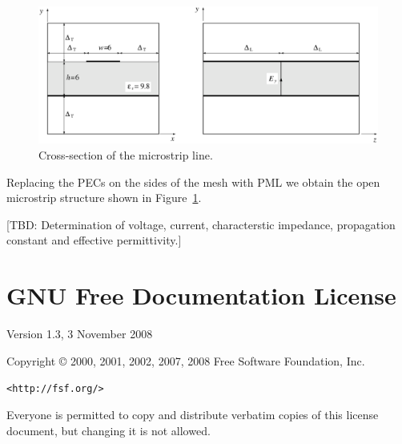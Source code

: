 \documentclass[onecolumn,a4paper]{article}
\numberwithin{equation}{section}
\begin{document}
\begin{figure}[ht]
\centerline{\includegraphics[width=0.75\linewidth]{figures/microstrip}}
\caption{\label{fg:microstrip}Cross-section of the microstrip line.}
\end{figure}

Replacing the PECs on the sides of the mesh with PML we obtain the open microstrip
structure shown in Figure~\ref{fg:microstrip}.

[TBD:  Determination of voltage, current, characterstic impedance, propagation constant 
and effective permittivity.]

%
%    
%
%
 

\label{sc:references}
\newpage
%
%    
%
%
\appendix
%
%
\section{GNU Free Documentation License}         
\label{ap:copyright}
%
%

\begin{center}

       Version 1.3, 3 November 2008


 Copyright \copyright{} 2000, 2001, 2002, 2007, 2008  Free Software Foundation, Inc.
 
 \bigskip
 
     \texttt{<http://fsf.org/>}
  
 \bigskip
 
 Everyone is permitted to copy and distribute verbatim copies
 of this license document, but changing it is not allowed.
\end{center}
\end{document}

